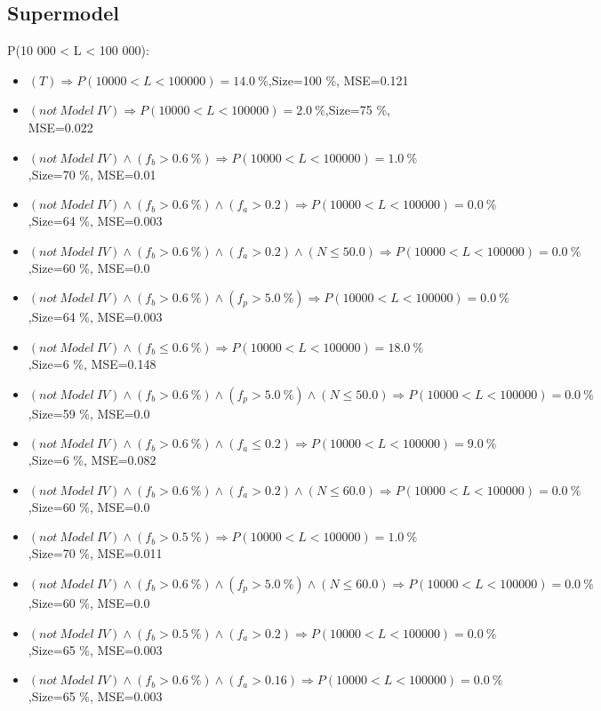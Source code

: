 \documentclass[numbered]{CSL}
\begin{document}
\subsection{Supermodel}
P(10 000 < L < 100 000):
\begin{itemize}
\item $(T) \Rightarrow P(10 000 < L < 100 000) = 14.0~\%$,\hfill Size=100 \%, MSE=0.121
\item $(not~Model~IV) \Rightarrow P(10 000 < L < 100 000) = 2.0~\%$,\hfill Size=75 \%, MSE=0.022
\item $(not~Model~IV) \land (f_b > 0.6~\%) \Rightarrow P(10 000 < L < 100 000) = 1.0~\%$,\hfill Size=70 \%, MSE=0.01
\item $(not~Model~IV) \land (f_b > 0.6~\%) \land (f_a > 0.2) \Rightarrow P(10 000 < L < 100 000) = 0.0~\%$,\hfill Size=64 \%, MSE=0.003
\item $(not~Model~IV) \land (f_b > 0.6~\%) \land (f_a > 0.2) \land (N \leq 50.0) \Rightarrow P(10 000 < L < 100 000) = 0.0~\%$,\hfill Size=60 \%, MSE=0.0
\item $(not~Model~IV) \land (f_b > 0.6~\%) \land (f_p > 5.0~\%) \Rightarrow P(10 000 < L < 100 000) = 0.0~\%$,\hfill Size=64 \%, MSE=0.003
\item $(not~Model~IV) \land (f_b \leq 0.6~\%) \Rightarrow P(10 000 < L < 100 000) = 18.0~\%$,\hfill Size=6 \%, MSE=0.148
\item $(not~Model~IV) \land (f_b > 0.6~\%) \land (f_p > 5.0~\%) \land (N \leq 50.0) \Rightarrow P(10 000 < L < 100 000) = 0.0~\%$,\hfill Size=59 \%, MSE=0.0
\item $(not~Model~IV) \land (f_b > 0.6~\%) \land (f_a \leq 0.2) \Rightarrow P(10 000 < L < 100 000) = 9.0~\%$,\hfill Size=6 \%, MSE=0.082
\item $(not~Model~IV) \land (f_b > 0.6~\%) \land (f_a > 0.2) \land (N \leq 60.0) \Rightarrow P(10 000 < L < 100 000) = 0.0~\%$,\hfill Size=60 \%, MSE=0.0
\item $(not~Model~IV) \land (f_b > 0.5~\%) \Rightarrow P(10 000 < L < 100 000) = 1.0~\%$,\hfill Size=70 \%, MSE=0.011
\item $(not~Model~IV) \land (f_b > 0.6~\%) \land (f_p > 5.0~\%) \land (N \leq 60.0) \Rightarrow P(10 000 < L < 100 000) = 0.0~\%$,\hfill Size=60 \%, MSE=0.0
\item $(not~Model~IV) \land (f_b > 0.5~\%) \land (f_a > 0.2) \Rightarrow P(10 000 < L < 100 000) = 0.0~\%$,\hfill Size=65 \%, MSE=0.003
\item $(not~Model~IV) \land (f_b > 0.6~\%) \land (f_a > 0.16) \Rightarrow P(10 000 < L < 100 000) = 0.0~\%$,\hfill Size=65 \%, MSE=0.003

\end{itemize}
\end{document}
